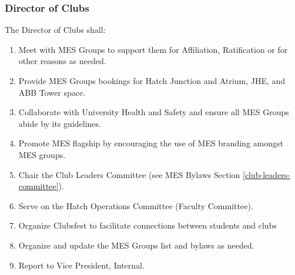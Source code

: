 
\subsubsection{Director of Clubs}
\label{director-of-clubs}
The Director of Clubs shall:

\begin{enumerate}
 \item
  Meet with MES Groups to support them for Affiliation, Ratification or for other reasons as needed. 
 \item    
  Provide MES Groups bookings for Hatch Junction and Atrium, JHE, and ABB Tower space. 
 \item    
  Collaborate with University Health and Safety and ensure all MES Groups abide by its guidelines. 
 \item
  Promote MES flagship by encouraging the use of MES branding amongst MES groups.
 \item
  Chair the Club Leaders Committee (see MES Bylaws Section \ref{club-leaders-committee}).
 \item
  Serve on the Hatch Operations Committee (Faculty Committee). 
 \item
  Organize Clubsfest to facilitate connections between students and clubs
 \item    
  Organize and update the MES Groups list and bylaws as needed. 
 \item    
  Report to Vice President, Internal.

\end{enumerate}
